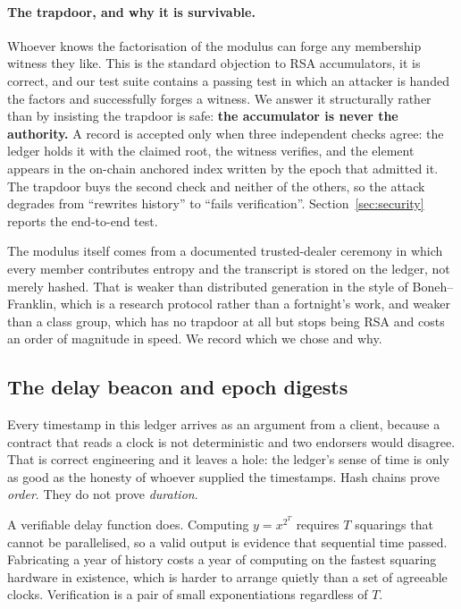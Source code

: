 \documentclass[11pt,a4paper]{article}
\begin{document}
\paragraph{The trapdoor, and why it is survivable.}
Whoever knows the factorisation of the modulus can forge any membership witness
they like. This is the standard objection to RSA accumulators, it is correct, and
our test suite contains a passing test in which an attacker is handed the factors
and successfully forges a witness. We answer it structurally rather than by
insisting the trapdoor is safe: \textbf{the accumulator is never the authority.}
A record is accepted only when three independent checks agree: the ledger holds
it with the claimed root, the witness verifies, and the element appears in the
on-chain anchored index written by the epoch that admitted it. The trapdoor buys
the second check and neither of the others, so the attack degrades from
``rewrites history'' to ``fails verification''. Section~\ref{sec:security}
reports the end-to-end test.

The modulus itself comes from a documented trusted-dealer ceremony in which every
member contributes entropy and the transcript is stored on the ledger, not merely
hashed. That is weaker than distributed generation in the style of
Boneh--Franklin, which is a research protocol rather than a fortnight's work, and
weaker than a class group, which has no trapdoor at all but stops being RSA and
costs an order of magnitude in speed. We record which we chose and why.

\subsection{The delay beacon and epoch digests}
\label{sec:beacon}

Every timestamp in this ledger arrives as an argument from a client, because a
contract that reads a clock is not deterministic and two endorsers would disagree.
That is correct engineering and it leaves a hole: the ledger's sense of time is
only as good as the honesty of whoever supplied the timestamps. Hash chains prove
\emph{order}. They do not prove \emph{duration}.

A verifiable delay function does. Computing $y = x^{2^{T}}$ requires $T$ squarings
that cannot be parallelised, so a valid output is evidence that sequential time
passed. Fabricating a year of history costs a year of computing on the fastest
squaring hardware in existence, which is harder to arrange quietly than a set of
agreeable clocks. Verification is a pair of small exponentiations regardless of
$T$.
\end{document}
